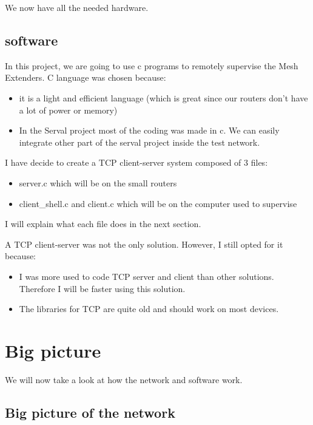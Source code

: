 We now have all the needed hardware.



\subsection{software}

In this project, we are going to use c programs to remotely supervise the Mesh Extenders.
C language was chosen because:
\begin{itemize}
	\item it is a light and efficient language (which is great since our routers don't have a lot of power or memory)
	\item In the Serval project most of the coding was made in c. We can easily integrate other part of the serval project inside the test network.
\end{itemize}


I have decide to create a TCP client-server system composed of 3 files:
\begin{itemize}
	\item server.c which will be on the small routers
	\item client\_shell.c and client.c which will be on the computer used to supervise
\end{itemize}

I will explain what each file does in the next section.


A TCP client-server was not the only solution. However, I still opted for it because:
\begin{itemize}
	\item I was more used to code TCP server and client than other solutions. Therefore I will be faster using this solution.
	\item The libraries for TCP are quite old and should work on most devices.
\end{itemize}



\section{Big picture}

We will now take a look at how the network and software work.


\subsection{Big picture of the network}





